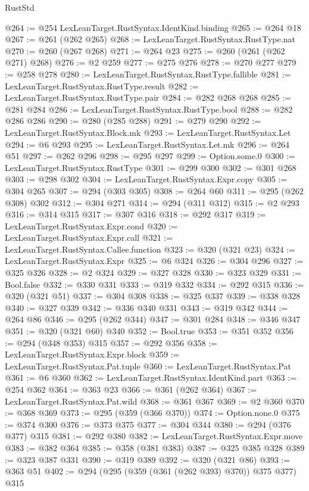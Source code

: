\begin{lexlean}{RustStd}
\begin{coremodule}
{\begin{coremodule}
{{{{{{{{{{@264 := @254 LexLeanTarget.RustSyntax.IdentKind.binding
@265 := @264 @18
@267 := @261 (@262 @265)
@268 := LexLeanTarget.RustSyntax.RustType.nat
@270 := @260 (@267 @268)
@271 := @264 @23
@275 := @260 (@261 (@262 @271) @268)
@276 := @2 @259
@277 := @275 @276
@278 := @270 @277
@279 := @258 @278
@280 := LexLeanTarget.RustSyntax.RustType.fallible
@281 := LexLeanTarget.RustSyntax.RustType.result
@282 := LexLeanTarget.RustSyntax.RustType.pair
@284 := @282 @268 @268
@285 := @281 @284
@286 := LexLeanTarget.RustSyntax.RustType.bool
@288 := @282 @286 @286
@290 := @280 (@285 @288)
@291 := @279 @290
@292 := LexLeanTarget.RustSyntax.Block.mk
@293 := LexLeanTarget.RustSyntax.Let
@294 := @6 @293
@295 := LexLeanTarget.RustSyntax.Let.mk
@296 := @264 @51
@297 := @262 @296
@298 := @295 @297
@299 := Option.some.{0}
@300 := LexLeanTarget.RustSyntax.RustType
@301 := @299 @300
@302 := @301 @268
@303 := @298 @302
@304 := LexLeanTarget.RustSyntax.Expr.copy
@305 := @304 @265
@307 := @294 (@303 @305)
@308 := @264 @60
@311 := @295 (@262 @308) @302
@312 := @304 @271
@314 := @294 (@311 @312)
@315 := @2 @293
@316 := @314 @315
@317 := @307 @316
@318 := @292 @317
@319 := LexLeanTarget.RustSyntax.Expr.cond
@320 := LexLeanTarget.RustSyntax.Expr.call
@321 := LexLeanTarget.RustSyntax.Callee.function
@323 := @320 (@321 @23)
@324 := LexLeanTarget.RustSyntax.Expr
@325 := @6 @324
@326 := @304 @296
@327 := @325 @326
@328 := @2 @324
@329 := @327 @328
@330 := @323 @329
@331 := Bool.false
@332 := @330 @331
@333 := @319 @332
@334 := @292 @315
@336 := @320 (@321 @51)
@337 := @304 @308
@338 := @325 @337
@339 := @338 @328
@340 := @327 @339
@342 := @336 @340 @331
@343 := @319 @342
@344 := @264 @86
@346 := @295 (@262 @344)
@347 := @301 @284
@348 := @346 @347
@351 := @320 (@321 @60) @340
@352 := Bool.true
@353 := @351 @352
@356 := @294 (@348 @353) @315
@357 := @292 @356
@358 := LexLeanTarget.RustSyntax.Expr.block
@359 := LexLeanTarget.RustSyntax.Pat.tuple
@360 := LexLeanTarget.RustSyntax.Pat
@361 := @6 @360
@362 := LexLeanTarget.RustSyntax.IdentKind.part
@363 := @254 @362
@364 := @363 @23
@366 := @361 (@262 @364)
@367 := LexLeanTarget.RustSyntax.Pat.wild
@368 := @361 @367
@369 := @2 @360
@370 := @368 @369
@373 := @295 (@359 (@366 @370))
@374 := Option.none.{0}
@375 := @374 @300
@376 := @373 @375
@377 := @304 @344
@380 := @294 (@376 @377) @315
@381 := @292 @380
@382 := LexLeanTarget.RustSyntax.Expr.move
@383 := @382 @364
@385 := @358 (@381 @383)
@387 := @325 @385 @328
@389 := @323 @387 @331
@390 := @319 @389
@392 := @320 (@321 @86)
@393 := @363 @51
@402 := @294 (@295 (@359 (@361 (@262 @393) @370)) @375 @377) @315
}}}}}}}}}}
\end{coremodule}}
\end{coremodule}
\end{lexlean}

